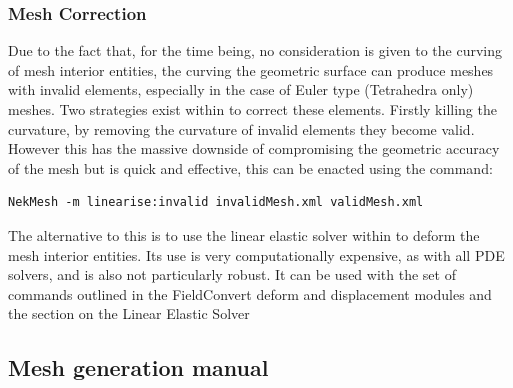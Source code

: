 \subsubsection{Mesh Correction}

Due to the fact that, for the time being, no consideration is given to the
curving of mesh interior entities, the curving the geometric surface can
produce meshes with invalid elements, especially in the case of Euler
type (Tetrahedra only) meshes. Two strategies exist within \nekpp to
correct these elements. Firstly killing the curvature, by removing the
curvature of invalid elements they become valid. However this has the
massive downside of compromising the geometric accuracy of the mesh but
is quick and effective, this can be enacted using the command:
\begin{lstlisting}[style=BashInputStyle]
    NekMesh -m linearise:invalid invalidMesh.xml validMesh.xml
\end{lstlisting}
%
The alternative to this is to use the linear elastic solver within \nekpp to
deform the mesh interior entities. Its use is very computationally expensive,
as with all PDE solvers, and is also not particularly robust. It can be used
with the set of commands outlined in the FieldConvert deform and displacement
modules and the section on the Linear Elastic Solver

\subsection{Mesh generation manual}

